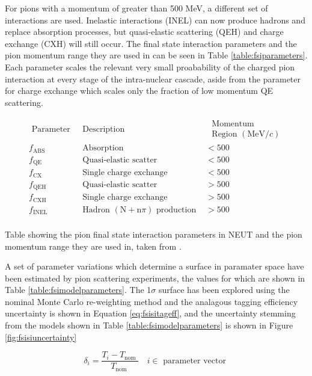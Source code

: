 For pions with a momentum of greater than 500 MeV, a different set of interactions are used. Inelastic interactions (INEL) can now produce hadrons and replace absorption processes, but quasi-elastic scattering (QEH) and charge exchange (CXH) will still occur. The final state interaction parameters and the pion momentum range they are used in can be seen in Table \ref{table:fsiparameters}. Each parameter scales the relevant very small proabability of the charged pion interaction at every stage of the intra-nuclear cascade, aside from the parameter for charge exchange which scales only the fraction of low momentum QE scattering. 


\begin{table}
$$
\begin{array}{ccc}
\text { Parameter } & \text { Description } & \begin{array}{c}
\text { Momentum } \\
\text { Region }(\mathrm{MeV} / c)
\end{array} \\
f_{\mathrm{ABS}} & \text { Absorption } & <500 \\
f_{\mathrm{QE}} & \text { Quasi-elastic scatter } & <500 \\
f_{\mathrm{CX}} & \text { Single charge exchange } & <500 \\
f_{\mathrm{QEH}} & \text { Quasi-elastic scatter } & >500 \\
f_{\mathrm{CXH}} & \text { Single charge exchange } & >500 \\
f_{\mathrm{INEL}} & \text { Hadron }(\mathrm{N}+\mathrm{n} \pi) \text { production } & >500 \\
\end{array}
$$
\caption{Table showing the pion final state interaction parameters in NEUT and the pion momentum range they are used in, taken from \cite{tn_32}.}
\label{table:fsiparameters}
\end{table}
A set of parameter variations which determine a surface in paramater space have been estimated by pion scattering experiments, the values for which are shown in Table \ref{table:fsimodelparameters}. The 1$\sigma$ surface has been explored using the nominal Monte Carlo re-weighting method and the analagous tagging efficiency uncertainty is shown in Equation \ref{eq:fsisitageff}, and the uncertainty stemming from the models shown in Table \ref{table:fsimodelparameters} is shown in Figure \ref{fig:fsisiuncertainty}

\begin{equation}
\delta_{i}=\frac{T_{i}-T_{\text {nom }}}{T_{\text {nom }}} \quad i \in \text { parameter vector }
\label{eq:fsisitageff}
\end{equation}

